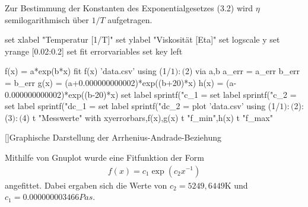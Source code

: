    Zur Bestimmung der Konstanten des Exponentialgesetzes (3.2) wird $\eta$ semilogarithmisch über $1/T$ aufgetragen. 
   \begin{center}
   \begin{gnuplot}[terminal=pdf,terminaloptions={font ",10" linewidth 1},scale=1.2]
		set xlabel "Temperatur [1/T]"
		set ylabel "Viskosität [Eta]"
        set logscale y
        set yrange [0.02:0.2]
        set fit errorvariables
        set key left
        
        f(x) = a*exp(b*x)
        fit f(x) 'data.csv' using (1/$1):($2) via a,b
        a_err = a_err 
        b_err = b_err
        g(x) = (a+0.000000000002)*exp((b+20)*x)
        h(x) = (a-0.000000000002)*exp((b-20)*x)
        set label sprintf("c_1 = %
		set label sprintf("c_2 = %
        set label sprintf("dc_1 = %
		set label sprintf("dc_2 = %
        plot 'data.csv' using (1/$1):($2):($3):($4) t "Messwerte" with xyerrorbars,f(x),g(x) t "f_min",h(x) t "f_max"
\end{gnuplot}
[]{Graphische Darstellung der Arrhenius-Andrade-Beziehung}
   \end{center}
 Mithilfe von Gnuplot wurde eine Fitfunktion der Form 
 \begin{align*}
 	f(x) = c_1 \exp(c_2 x^{-1})
 \end{align*}
 angefittet.
 Dabei ergaben sich die Werte von $c_2 = 5249,6449 \si{\kelvin} $ und  $c_1=0.000000003466 Pas$. \\
 


   
  